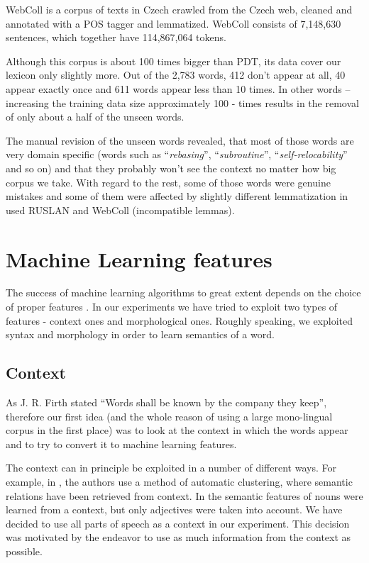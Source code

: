\documentclass[letterpaper]{article}
\begin{document}
WebColl\cite{webcoll} is a corpus of texts in Czech crawled from the Czech web, cleaned and annotated  with a POS tagger and lemmatized.
WebColl consists of 7,148,630 sentences, which together have 114,867,064 tokens. 

Although this corpus is about 100 times bigger than PDT, its data cover our lexicon only slightly more. Out of the 2,783 words, 412 don't appear at all, 
40 appear exactly once and 611 words appear less than 10 times. In other words -- increasing the training data size approximately 100 - times results in the removal of only about a half of the unseen words.

The manual revision of the unseen words revealed, that most of those words are very domain specific 
(words such as ``\emph{rebasing}'', ``\emph{subroutine}'', ``\emph{self-relocability}'' and so on) 
and that they probably won't see the context no matter how big corpus we take. With regard to the rest, some of those words were genuine mistakes and some of them were affected by slightly different lemmatization in used RUSLAN and WebColl (incompatible lemmas).


\section{Machine Learning features}
The success of machine learning algorithms to great extent depends on the 
choice of proper 
features
. In our experiments we have tried to exploit two types of features 
- context ones and morphological ones. 
Roughly speaking, we exploited syntax and morphology in order to learn semantics of a word.  

\subsection{Context}
As J. R. Firth stated ``Words shall be known by the company they keep'',
therefore our first idea (and the whole reason of using a large mono-lingual corpus in the first place) 
was to look at the context in which the words appear and to try to convert it to machine learning features.

The context can in principle be exploited in a number of different ways. For example, in \cite{baroni:2009}, the authors use a method of automatic clustering,  
where semantic relations have been retrieved from context. 
In \cite{biemann05} the semantic features of nouns were learned
from a context, but only adjectives were taken into account.
We have decided to use all parts of speech as a context in our experiment. This decision was motivated by the endeavor to use as much information from the context as possible. 
\end{document}
